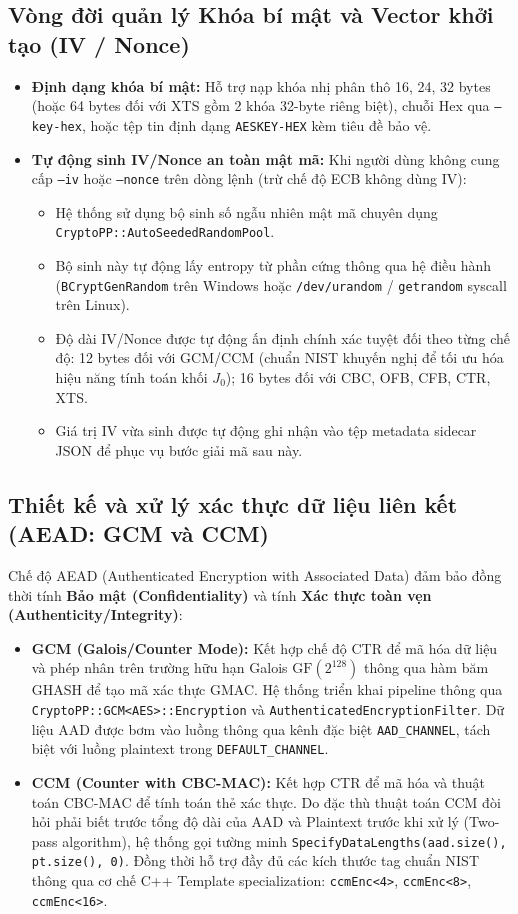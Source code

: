 \documentclass[12pt, a4paper]{report}
\begin{document}
\subsection{Vòng đời quản lý Khóa bí mật và Vector khởi tạo (IV / Nonce)}
\begin{itemize}
    \item \textbf{Định dạng khóa bí mật:} Hỗ trợ nạp khóa nhị phân thô 16, 24, 32 bytes (hoặc 64 bytes đối với XTS gồm 2 khóa 32-byte riêng biệt), chuỗi Hex qua \texttt{--key-hex}, hoặc tệp tin định dạng \texttt{AESKEY-HEX} kèm tiêu đề bảo vệ.
    \item \textbf{Tự động sinh IV/Nonce an toàn mật mã:} Khi người dùng không cung cấp \texttt{--iv} hoặc \texttt{--nonce} trên dòng lệnh (trừ chế độ ECB không dùng IV):
    \begin{itemize}
        \item Hệ thống sử dụng bộ sinh số ngẫu nhiên mật mã chuyên dụng \texttt{CryptoPP::AutoSeededRandomPool}.
        \item Bộ sinh này tự động lấy entropy từ phần cứng thông qua hệ điều hành (\texttt{BCryptGenRandom} trên Windows hoặc \texttt{/dev/urandom} / \texttt{getrandom} syscall trên Linux).
        \item Độ dài IV/Nonce được tự động ấn định chính xác tuyệt đối theo từng chế độ: 12 bytes đối với GCM/CCM (chuẩn NIST khuyến nghị để tối ưu hóa hiệu năng tính toán khối $J_0$); 16 bytes đối với CBC, OFB, CFB, CTR, XTS.
        \item Giá trị IV vừa sinh được tự động ghi nhận vào tệp metadata sidecar JSON để phục vụ bước giải mã sau này.
    \end{itemize}
\end{itemize}

\subsection{Thiết kế và xử lý xác thực dữ liệu liên kết (AEAD: GCM và CCM)}
Chế độ AEAD (Authenticated Encryption with Associated Data) đảm bảo đồng thời tính \textbf{Bảo mật (Confidentiality)} và tính \textbf{Xác thực toàn vẹn (Authenticity/Integrity)}:
\begin{itemize}
    \item \textbf{GCM (Galois/Counter Mode):} Kết hợp chế độ CTR để mã hóa dữ liệu và phép nhân trên trường hữu hạn Galois $\text{GF}(2^{128})$ thông qua hàm băm GHASH để tạo mã xác thực GMAC. Hệ thống triển khai pipeline thông qua \texttt{CryptoPP::GCM<AES>::Encryption} và \texttt{AuthenticatedEncryptionFilter}. Dữ liệu AAD được bơm vào luồng thông qua kênh đặc biệt \texttt{AAD\_CHANNEL}, tách biệt với luồng plaintext trong \texttt{DEFAULT\_CHANNEL}.
    \item \textbf{CCM (Counter with CBC-MAC):} Kết hợp CTR để mã hóa và thuật toán CBC-MAC để tính toán thẻ xác thực. Do đặc thù thuật toán CCM đòi hỏi phải biết trước tổng độ dài của AAD và Plaintext trước khi xử lý (Two-pass algorithm), hệ thống gọi tường minh \texttt{SpecifyDataLengths(aad.size(), pt.size(), 0)}. Đồng thời hỗ trợ đầy đủ các kích thước tag chuẩn NIST thông qua cơ chế C++ Template specialization: \texttt{ccmEnc<4>}, \texttt{ccmEnc<8>}, \texttt{ccmEnc<16>}.
\end{itemize}
\end{document}
